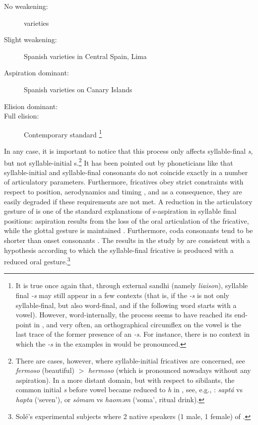 \documentclass[output=paper,hidelinks]{langscibook}
\begin{document}
\begin{description}
    \item[No weakening:]  varieties
    \item[Slight weakening:] Spanish varieties in Central Spain, Lima
    \item[Aspiration dominant:] Spanish varieties on Canary Islands
    \item[Elision dominant:] 
    \item[Full elision:] Contemporary standard \footnote{It is true once again that, through external sandhi (namely \emph{liaison}), syllable final \emph{-s} may still appear in a few contexts (that is, if the \emph{-s} is not only syllable-final, but also word-final, and if the following word starts with a vowel). However, word-internally, the process seems to have reached its end-point in , and very often, an orthographical circumflex on the vowel is the last trace of the former presence of an \emph{-s}. For instance, there is no context in which the \emph{-s} in the examples in  would be pronounced.}
\end{description}
In any case, it is important to notice that this process only affects syllable-final \textsl{s}, but not syllable-initial s.\footnote{There are cases, however, where syllable-initial fricatives are concerned, see  \emph{fermoso} (beautiful) $>$ \emph{hermoso} (which is pronounced nowadays without any aspiration). In a more distant domain, but with respect to sibilants, the common  initial \emph{s} before vowel became reduced to \emph{h} in , see, e.g., \citet[43]{williams92}:  \emph{saptá} vs  \emph{hapta} (`seven'), or  \emph{sômam} vs  \emph{haoməm} (`soma', ritual drink).} It has been pointed out by phoneticians like \citet[249]{sole10} that syllable-initial and syllable-final consonants do not coincide exactly in a number of articulatory parameters. Furthermore, fricatives obey strict constraints with respect to position, aerodynamics and timing \citep[see][291f., and references therein]{sole10}, and as a consequence, they are easily degraded if these requirements are not met. A reduction in the articulatory gesture of is one of the standard explanations of s-aspiration in syllable final positions: aspiration results from the loss of the oral articulation of the fricative, while the glottal gesture is maintained \citep[see][293]{sole10}. Furthermore, coda consonants tend to be shorter than onset consonants \citep[see][293]{sole10}. The results in the study by \citet[301]{sole10} are consistent with a hypothesis according to which the syllable-final fricative is produced with a reduced oral gesture.\footnote{Solé's experimental subjects where 2 native speakers (1 male, 1 female) of .}
\end{document}

